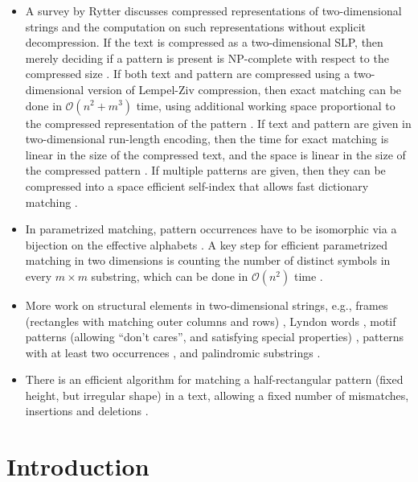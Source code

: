 \documentclass[11pt]{article}
\renewcommand{\O}{\mathcal{O}}
\theoremstyle{plain}
\theoremstyle{definition}
\theoremstyle{remark}
\begin{document}
\begin{itemize}
	\item A survey by Rytter \cite{Rytter2000} discusses compressed representations of two-dimensional strings and the computation on such representations without explicit decompression. If the text is compressed as a two-dimensional SLP, then merely deciding if a pattern is present is NP-complete with respect to the compressed size \cite{Berman2002}. If both text and pattern are compressed using a two-dimensional version of Lempel-Ziv compression, then exact matching can be done in $\O(n^2 + m^3)$ time, using additional working space proportional to the compressed representation of the pattern \cite{Amir2003}. If text and pattern are given in two-dimensional run-length encoding, then the time for exact matching is linear in the size of the compressed text, and the space is linear in the size of the compressed pattern \cite{Amir2003a}. If multiple patterns are given, then they can be compressed into a space efficient self-index that allows fast dictionary matching \cite{Neuburger2013}.
	\item In parametrized matching, pattern occurrences have to be isomorphic via a bijection on the effective alphabets \cite{Amir2006,Cole2014}. A key step for efficient parametrized matching in two dimensions is counting the number of distinct symbols in every $m \times m$ substring, which can be done in $\O(n^2)$ time \cite{Cole2014}.
	\item More work on structural elements in two-dimensional strings, e.g., frames (rectangles with matching outer columns and rows) \cite{Boneh2023}, Lyndon words \cite{Marcus2017}, motif patterns (allowing ``don't cares'', and satisfying special properties) \cite{Apostolico2008}, patterns with at least two occurrences \cite{Karp1972}, and palindromic substrings \cite{Mahalingam2019}.
	\item There is an efficient algorithm for matching a half-rectangular pattern (fixed height, but irregular shape) in a text, allowing a fixed number of mismatches, insertions and deletions \cite{Amir1995}.
\end{itemize}


\section{Introduction}

\newcommand{\hd}{\textsc{HD1D}\xspace}
\newcommand{\HD}{\textsc{HD2D}\xspace}
\end{document}
